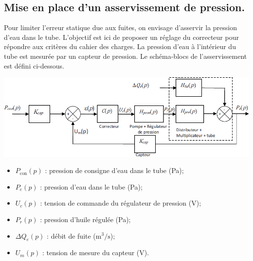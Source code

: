 \documentclass[10pt,fleqn]{article} %
\begin{document}
\begin{multicols}{2}
%
%
%
%
%
%

\subsection*{Mise en place d'un asservissement de pression.}
Pour limiter l’erreur statique due aux fuites, on envisage d’asservir la pression d’eau dans le tube. L’objectif est ici de proposer un réglage du correcteur pour répondre aux critères du cahier des charges.
La pression d’eau à l’intérieur du tube est mesurée par un capteur de pression. Le schéma-blocs de l’asservissement est défini ci-dessous.

\begin{center}
\includegraphics[width=\linewidth]{images/fig_06}
\end{center}

\begin{itemize}
\item $P_{\text{con}}(p)$ 	: 	pression de consigne d’eau dans le tube (Pa);
\item $P_e(p)$ 	:	pression d’eau dans le tube (Pa);
\item $U_c(p)$ 	: 	tension de commande du régulateur de pression (V);
\item $P_r(p)$ 	:	pression d’huile régulée (Pa);
\item $\Delta Q_e(p)$ 	:	débit de fuite ($\text{m}^3/\text{s}$);
\item $U_m(p)$ 	:	tension de mesure du capteur (V).
\end{itemize}


\end{multicols}
\end{document}
